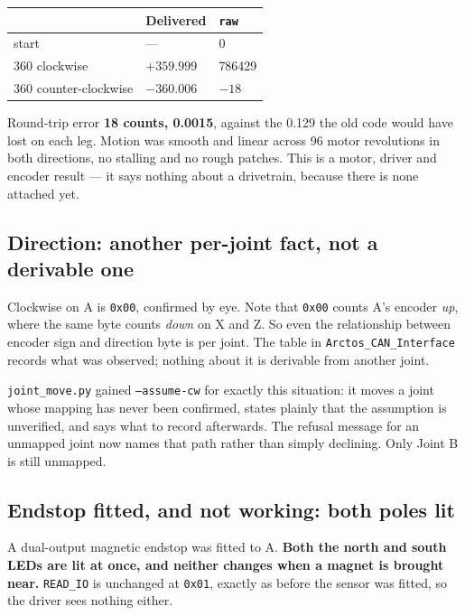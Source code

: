 \documentclass[11pt,letterpaper]{article}
\begin{document}
\begin{center}
\begin{tabular}{lll}
\toprule
 & \textbf{Delivered} & \texttt{raw} \\ \midrule
start                     & ---                     & 0 \\
360\textdegree{} clockwise & $+359.999$\textdegree{} & 786429 \\
360\textdegree{} counter-clockwise & $-360.006$\textdegree{} & $-18$ \\
\bottomrule
\end{tabular}
\end{center}

Round-trip error \textbf{18 counts, 0.0015\textdegree{}}, against the
0.129\textdegree{} the old code would have lost on each leg. Motion was smooth
and linear across 96 motor revolutions in both directions, no stalling and no
rough patches. This is a motor, driver and encoder result --- it says nothing
about a drivetrain, because there is none attached yet.

\subsection{Direction: another per-joint fact, not a derivable one}
Clockwise on A is \texttt{0x00}, confirmed by eye. Note that \texttt{0x00} counts
A's encoder \emph{up}, where the same byte counts \emph{down} on X and Z. So even
the relationship between encoder sign and direction byte is per joint. The table
in \texttt{Arctos\_CAN\_Interface} records what was observed; nothing about it is
derivable from another joint.

\texttt{joint\_move.py} gained \texttt{--assume-cw} for exactly this situation: it
moves a joint whose mapping has never been confirmed, states plainly that the
assumption is unverified, and says what to record afterwards. The refusal message
for an unmapped joint now names that path rather than simply declining. Only
Joint B is still unmapped.

\subsection{Endstop fitted, and not working: both poles lit}
A dual-output magnetic endstop was fitted to A. \textbf{Both the north and south
LEDs are lit at once, and neither changes when a magnet is brought near.}
\texttt{READ\_IO} is unchanged at \texttt{0x01}, exactly as before the sensor was
fitted, so the driver sees nothing either.
\end{document}
